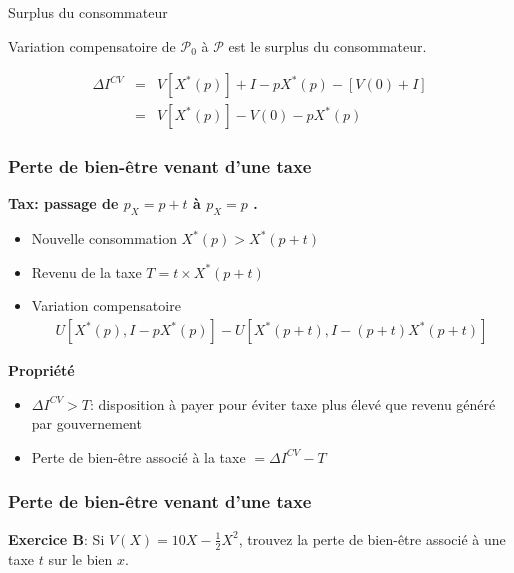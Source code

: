 \documentclass[handout]{beamer}
\newcommand{\mcl}{\mathcal}
\newcommand{\mdp}{\medskip \pause}
\begin{document}
\begin{frame}{Surplus du consommateur}

Variation compensatoire de $\mcl P_0$ à $\mcl P$ est le surplus du consommateur. 

\begin{eqnarray*}
\Delta I^{CV} &=& V[X^*(p)] + I - pX^*(p) - [V(0) + I] \\
&=& V[X^*(p)] - V(0) - p X^*(p)
\end{eqnarray*}

\end{frame}

\begin{frame} \frametitle{Perte de bien-être venant d'une taxe}
\textbf{Tax: passage de $p_X = p+t$    à $p_X = p$  .} \begin{itemize}
\item Nouvelle consommation $X^*(p) > X^*(p+t)$ \item Revenu de la taxe $T
= t\times X^*(p+t)$ \item Variation compensatoire 
\begin{eqnarray*}
U[X^*(p), I - pX^*(p)] - U[X^*(p+t), I - (p+t) X^*(p+t)]
\end{eqnarray*}
\end{itemize}\mdp


\textbf{Propriété} \begin{itemize} \item $\Delta I^{CV} > T$: disposition à payer pour éviter taxe plus élevé que revenu généré par gouvernement \item Perte de bien-être associé à la taxe $= \Delta I^{CV} - T$ \end{itemize}



\end{frame}

\begin{frame} \frametitle{Perte de bien-être venant d'une taxe}

\textbf{Exercice B}: Si $V(X) = 10 X - \frac{1}{2}X^2$, trouvez la perte de bien-être associé à une taxe $t$ sur le bien $x$. 
\end{frame}
\end{document}
